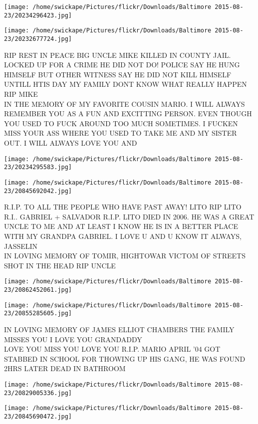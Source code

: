 \documentclass[10pt,letterpaper]{article}
\begin{document}
\texttt{[image: /home/swickape/Pictures/flickr/Downloads/Baltimore 2015-08-23/20234296423.jpg]}

\vspace{0.25in}
\texttt{[image: /home/swickape/Pictures/flickr/Downloads/Baltimore 2015-08-23/20232677724.jpg]}

RIP REST IN PEACE BIG UNCLE MIKE KILLED IN COUNTY JAIL.  LOCKED UP FOR A CRIME HE DID NOT DO!  POLICE SAY HE HUNG HIMSELF BUT OTHER WITNESS SAY HE DID NOT KILL HIMSELF UNTILL HTIS DAY MY FAMILY DONT KNOW WHAT REALLY HAPPEN RIP MIKE\\
IN THE MEMORY OF MY FAVORITE COUSIN MARIO.  I WILL ALWAYS REMEMBER YOU AS A FUN AND EXCITTING PERSON.  EVEN THOUGH YOU USED TO FUCK AROUND TOO MUCH SOMETIMES.  I FUCKEN MISS YOUR ASS WHERE YOU USED TO TAKE ME AND MY SISTER OUT.  I WILL ALWAYS LOVE YOU AND
\pagebreak

\texttt{[image: /home/swickape/Pictures/flickr/Downloads/Baltimore 2015-08-23/20234295583.jpg]}

\vspace{0.25in}
\texttt{[image: /home/swickape/Pictures/flickr/Downloads/Baltimore 2015-08-23/20845692042.jpg]}

R.I.P. TO ALL THE PEOPLE WHO HAVE PAST AWAY!  LITO RIP LITO R.I.. GABRIEL + SALVADOR R.I.P. LITO DIED IN 2006.  HE WAS A GREAT UNCLE TO ME AND AT LEAST I KNOW HE IS IN A BETTER PLACE WITH MY GRANDPA GABRIEL.  I LOVE U AND U KNOW IT ALWAYS, JASSELIN\\
IN LOVING MEMORY OF TOMIR, HIGHTOWAR VICTOM OF STREETS SHOT IN THE HEAD RIP UNCLE
\pagebreak

\texttt{[image: /home/swickape/Pictures/flickr/Downloads/Baltimore 2015-08-23/20862452061.jpg]}

\vspace{0.25in}
\texttt{[image: /home/swickape/Pictures/flickr/Downloads/Baltimore 2015-08-23/20855285605.jpg]}

IN LOVING MEMORY OF JAMES ELLIOT CHAMBERS THE FAMILY MISSES YOU I LOVE YOU GRANDADDY\\
LOVE YOU MISS YOU LOVE YOU R.I.P. MARIO APRIL '04 GOT STABBED IN SCHOOL FOR THOWING UP HIS GANG, HE WAS FOUND 2HRS LATER DEAD IN BATHROOM
\pagebreak

\texttt{[image: /home/swickape/Pictures/flickr/Downloads/Baltimore 2015-08-23/20829005336.jpg]}

\vspace{0.25in}
\texttt{[image: /home/swickape/Pictures/flickr/Downloads/Baltimore 2015-08-23/20845690472.jpg]}
\end{document}
